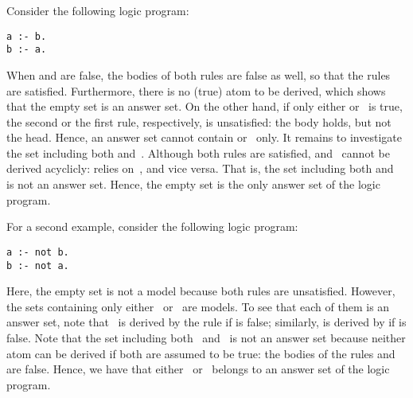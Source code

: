 \begin{example}\label{ex:as:one}
Consider the following logic program:
%
\begin{lstlisting}[numbers=none]
a :- b.
b :- a.
\end{lstlisting}
%
When  and  are false, the bodies of both rules are false as well,
so that the rules are satisfied.
Furthermore, there is no (true) atom to be derived,
which shows that the empty set is an answer set. 
On the other hand, if only either  or~ is true,
the second or the first rule, respectively, is unsatisfied:
the body holds, but not the head.
Hence, an answer set cannot contain  or~ only.
It remains to investigate the set including both  and~.
Although both rules are satisfied, %
 and~ cannot be derived acyclicly:
 relies on~, and vice versa.
That is, the set including both  and~ is not an answer set. %
Hence, the empty set is the only answer set of the logic program.
\eexample
\end{example}

\begin{example}\label{ex:as:two}
For a second example, consider the following logic program:
%
\begin{lstlisting}[numbers=none]
a :- not b.
b :- not a.
\end{lstlisting}
%
Here, the empty set is not a model because both rules are unsatisfied.
However, the sets containing only either~ or~ are models.
To see that each of them is an answer set,
note that~ is derived by the rule 
if  is false;
similarly,
 is derived by 
if  is false.
Note that the set including both~ and~ is not an answer set
because neither atom can be derived if both are assumed to be true:
the bodies of the rules
 and
 are false.
Hence, we have that
either~ or~ belongs to
an answer set of the logic program.
\eexample
\end{example}

